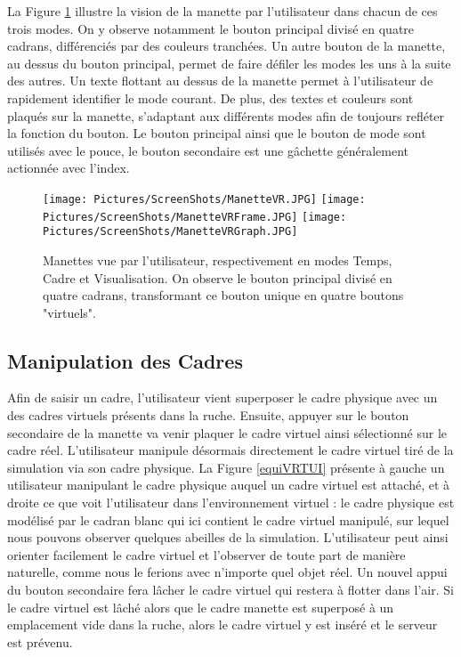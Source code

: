 		La Figure \ref{ManetteVR} illustre la vision de la manette par l'utilisateur dans chacun de ces trois modes. On y observe notamment le bouton principal divisé en quatre cadrans, différenciés par des couleurs tranchées. Un autre bouton de la manette, au dessus du bouton principal, permet de faire défiler les modes les uns à la suite des autres. Un texte flottant au dessus de la manette permet à l'utilisateur de rapidement identifier le mode courant. De plus, des textes et couleurs sont plaqués sur la manette, s'adaptant aux différents modes afin de toujours refléter la fonction du bouton. Le bouton principal ainsi que le bouton de mode sont utilisés avec le pouce, le bouton secondaire est une gâchette généralement actionnée avec l'index.
		
		\begin{figure}
		\centering
		\texttt{[image: Pictures/ScreenShots/ManetteVR.JPG]}
		\texttt{[image: Pictures/ScreenShots/ManetteVRFrame.JPG]}
		\texttt{[image: Pictures/ScreenShots/ManetteVRGraph.JPG]}
		\caption[Manette vue par l'utilisateur, respectivement en mode Temps, Cadre et Visualisation.]{Manettes vue par l'utilisateur, respectivement en modes Temps, Cadre et Visualisation. On observe le bouton principal divisé en quatre cadrans, transformant ce bouton unique en quatre boutons "virtuels".}
		\label{ManetteVR}
		\end{figure}
		
		\subsection{Manipulation des Cadres}		
		
			
		Afin de saisir un cadre, l'utilisateur vient superposer le cadre physique avec un des cadres virtuels présents dans la ruche. Ensuite, appuyer sur le bouton secondaire de la manette va venir plaquer le cadre virtuel ainsi sélectionné sur le cadre réel. L'utilisateur manipule désormais directement le cadre virtuel tiré de la simulation via son cadre physique. La Figure \ref{equiVRTUI} présente à gauche un utilisateur manipulant le cadre physique auquel un cadre virtuel est attaché, et à droite ce que voit l'utilisateur dans l'environnement virtuel : le cadre physique est modélisé par le cadran blanc qui ici contient le cadre virtuel manipulé, sur lequel nous pouvons observer quelques abeilles de la simulation. L'utilisateur peut ainsi orienter facilement le cadre virtuel et l'observer de toute part de manière naturelle, comme nous le ferions avec n'importe quel objet réel. Un nouvel appui du bouton secondaire fera lâcher le cadre virtuel qui restera à flotter dans l'air. Si le cadre virtuel est lâché alors que le cadre manette est superposé à un emplacement vide dans la ruche, alors le cadre virtuel y est inséré et le serveur est prévenu.	

